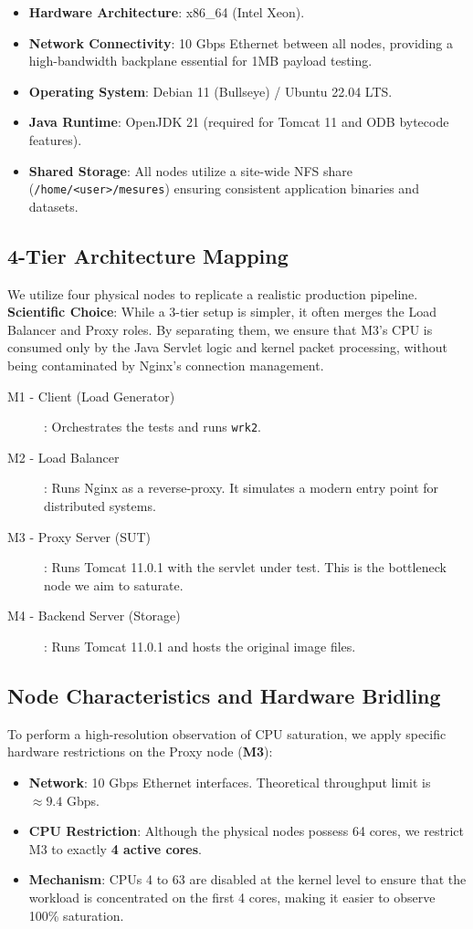 \documentclass[a4paper,12pt]{article}
\begin{document}
\begin{itemize}
    \item \textbf{Hardware Architecture}: x86\_64 (Intel Xeon).
    \item \textbf{Network Connectivity}: 10 Gbps Ethernet between all nodes, providing a high-bandwidth backplane essential for 1MB payload testing.
    \item \textbf{Operating System}: Debian 11 (Bullseye) / Ubuntu 22.04 LTS.
    \item \textbf{Java Runtime}: OpenJDK 21 (required for Tomcat 11 and ODB bytecode features).
    \item \textbf{Shared Storage}: All nodes utilize a site-wide NFS share (\texttt{/home/<user>/mesures}) ensuring consistent application binaries and datasets.
\end{itemize}

\subsection{4-Tier Architecture Mapping}
We utilize four physical nodes to replicate a realistic production pipeline. \textbf{Scientific Choice}: While a 3-tier setup is simpler, it often merges the Load Balancer and Proxy roles. By separating them, we ensure that M3's CPU is consumed only by the Java Servlet logic and kernel packet processing, without being contaminated by Nginx's connection management.
\begin{description}
    \item[M1 - Client (Load Generator)]: Orchestrates the tests and runs \texttt{wrk2}.
    \item[M2 - Load Balancer]: Runs Nginx as a reverse-proxy. It simulates a modern entry point for distributed systems.
    \item[M3 - Proxy Server (SUT)]: Runs Tomcat 11.0.1 with the servlet under test. This is the bottleneck node we aim to saturate.
    \item[M4 - Backend Server (Storage)]: Runs Tomcat 11.0.1 and hosts the original image files.
\end{description}

\subsection{Node Characteristics and Hardware Bridling}
To perform a high-resolution observation of CPU saturation, we apply specific hardware restrictions on the Proxy node (\textbf{M3}):
\begin{itemize}
    \item \textbf{Network}: 10 Gbps Ethernet interfaces. Theoretical throughput limit is $\approx 9.4$ Gbps.
    \item \textbf{CPU Restriction}: Although the physical nodes possess 64 cores, we restrict M3 to exactly \textbf{4 active cores}.
    \item \textbf{Mechanism}: CPUs 4 to 63 are disabled at the kernel level to ensure that the workload is concentrated on the first 4 cores, making it easier to observe 100\% saturation.
\end{itemize}
\end{document}
